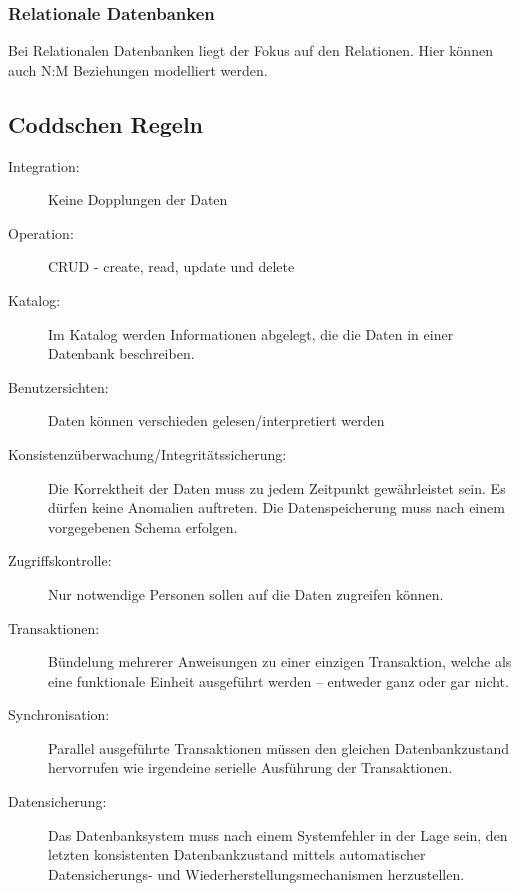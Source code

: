 \documentclass[12pt,a4paper]{article}
\begin{document}
		\subsubsection{Relationale Datenbanken}
			Bei Relationalen Datenbanken liegt der Fokus auf den Relationen. Hier können auch N:M Beziehungen modelliert werden.
			
	\subsection{Coddschen Regeln}
		\begin{description}
			\item[Integration:] Keine Dopplungen der Daten
			\item[Operation:] CRUD - create, read, update und delete 
			\item[Katalog:] Im Katalog werden Informationen abgelegt, die die Daten in einer Datenbank beschreiben.
			\item[Benutzersichten:] Daten können verschieden gelesen/interpretiert werden
			\item[Konsistenzüberwachung/Integritätssicherung:] Die Korrektheit der Daten muss zu jedem Zeitpunkt gewährleistet sein. Es dürfen keine Anomalien auftreten. Die Datenspeicherung muss nach einem vorgegebenen Schema erfolgen. 
			\item[Zugriffskontrolle:] Nur notwendige Personen sollen auf die Daten zugreifen können.
			\item[Transaktionen:] Bündelung mehrerer Anweisungen zu einer einzigen Transaktion, welche als eine funktionale Einheit ausgeführt werden – entweder ganz oder gar nicht.
			\item[Synchronisation:] Parallel ausgeführte Transaktionen müssen den gleichen Datenbankzustand hervorrufen wie irgendeine serielle Ausführung der Transaktionen.
			\item[Datensicherung:] Das Datenbanksystem muss nach einem Systemfehler in der Lage sein, den letzten konsistenten Datenbankzustand mittels automatischer Datensicherungs- und Wiederherstellungsmechanismen herzustellen.   
		\end{description}
			
\end{document}
